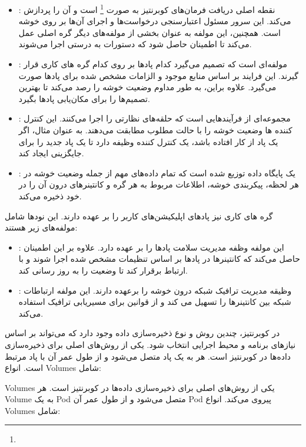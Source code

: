 \begin{itemize}
	\item 
{}: 
نقطه اصلی دریافت فرمان‌های کوبرنتیز به صورت \footnote{} است و آن را پردازش می‌کند. این سرور مسئول اعتبارسنجی درخواست‌ها و اجرای آن‌ها بر روی خوشه است. همچنین، این مولفه به عنوان بخشی از مولفه‌های دیگر گره اصلی عمل می‌کند تا اطمینان حاصل شود که دستورات به درستی اجرا می‌شوند.
	\item 
{}: 
مولفه‌ای است که تصمیم می‌گیرد کدام پادها بر روی کدام گره های کاری قرار گیرند. این فرایند بر اساس منابع موجود و الزامات مشخص شده برای پادها صورت می‌گیرد. علاوه براین، به طور مداوم وضعیت خوشه را رصد می‌کند تا بهترین تصمیم‌ها را برای مکان‌یابی پادها بگیرد.
	\item 
{}:
مجموعه‌ای از فرآیند‌هایی است که حلقه‌های نظارتی را اجرا می‌کنند. این کنترل کننده ها وضعیت خوشه را با حالت مطلوب مطابقت می‌دهند. به عنوان مثال، اگر یک پاد از کار افتاده باشد، یک کنترل کننده وظیفه دارد تا یک پاد جدید را برای جایگزینی ایجاد کند.
	\item 
{}: 
یک پایگاه داده توزیع شده است که تمام داده‌های مهم از جمله وضعیت خوشه در هر لحظه، پیکربندی خوشه، اطلاعات مربوط به هر گره و کانتینرهای درون آن را در خود ذخیره می‌کند. 
\end{itemize}

گره های کاری نیز پادهای اپلیکیشن‌های کاربر را بر عهده دارند. این نودها شامل مولفه‌های زیر هستند:
\begin{itemize}
	\item 
{}:
 این مولفه وظفه مدیریت سلامت پادها را بر عهده دارد. علاوه بر این اطمینان حاصل می‌کند که کانتینرها در پادها بر اساس تنظیمات مشخص شده اجرا شوند و با  ارتباط برقرار کند تا وضعیت را به روز رسانی کند.
 	\item
{}: 
 وظیقه مدیریت ترافیک شبکه درون خوشه را برعهده دارند. این مولفه ارتباطات شبکه بین کانتینرها را تسهیل می کند و از قوانین  برای مسیریابی ترافیک استفاده می‌کند.
\end{itemize}



در کوبرنتیز، چندین روش و نوع ذخیره‌سازی داده وجود دارد که می‌تواند بر اساس نیازهای برنامه و محیط اجرایی انتخاب شود.  یکی از روش‌های اصلی برای ذخیره‌سازی داده‌ها در کوبرنتیز است. هر  به یک پاد متصل می‌شود و از طول عمر آن با پاد مرتبط است. انواع Volumes شامل:


Volumes یکی از روش‌های اصلی برای ذخیره‌سازی داده‌ها در کوبرنتیز است. هر Volume به یک Pod متصل می‌شود و از طول عمر آن Pod پیروی می‌کند. انواع Volumes شامل:

